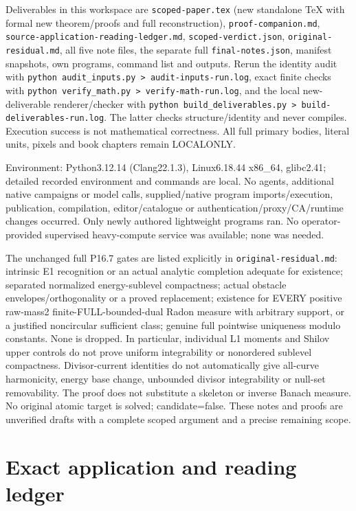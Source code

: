 \documentclass[11pt]{article}
\begin{document}
Deliverables in this workspace are \texttt{scoped-paper.tex} (new standalone TeX with formal new theorem/proofs and full reconstruction), \texttt{proof-companion.md}, \texttt{source-application-reading-ledger.md}, \texttt{scoped-verdict.json}, \texttt{original-residual.md}, all five note files, the separate full \texttt{final-notes.json}, manifest snapshots, own programs, command list and outputs. Rerun the identity audit with \texttt{python audit\_inputs.py > audit-inputs-run.log}, exact finite checks with \texttt{python verify\_math.py > verify-math-run.log}, and the local new-deliverable renderer/checker with \texttt{python build\_deliverables.py > build-deliverables-run.log}. The latter checks structure/identity and never compiles. Execution success is not mathematical correctness. All full primary bodies, literal units, pixels and book chapters remain LOCALONLY.

Environment: Python3.12.14 (Clang22.1.3), Linux6.18.44 x86\_64, glibc2.41; detailed recorded environment and commands are local. No agents, additional native campaigns or model calls, supplied/native program imports/execution, publication, compilation, editor/catalogue or authentication/proxy/CA/runtime changes occurred. Only newly authored lightweight programs ran. No operator-provided supervised heavy-compute service was available; none was needed.

The unchanged full P16.7 gates are listed explicitly in \texttt{original-residual.md}: intrinsic E1 recognition or an actual analytic completion adequate for existence; separated normalized energy-sublevel compactness; actual obstacle envelopes/orthogonality or a proved replacement; existence for EVERY positive raw-mass2 finite-FULL-bounded-dual Radon measure with arbitrary support, or a justified noncircular sufficient class; genuine full pointwise uniqueness modulo constants. None is dropped. In particular, individual L1 moments and Shilov upper controls do not prove uniform integrability or nonordered sublevel compactness. Divisor-current identities do not automatically give all-curve harmonicity, energy base change, unbounded divisor integrability or null-set removability. The proof does not substitute a skeleton or inverse Banach measure. No original atomic target is solved; candidate=false. These notes and proofs are unverified drafts with a complete scoped argument and a precise remaining scope.

\section*{Exact application and reading ledger}
\end{document}
